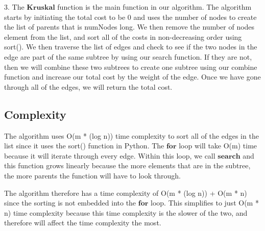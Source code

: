 3. The $\textbf{Kruskal}$ function is the main function in our algorithm. The algorithm starts by initiating the total cost to be 0 and uses the number of nodes to create the list of parents that is numNodes long. We then remove the number of nodes element from the list, and sort all of the costs in non-decreasing order using sort(). We then traverse the list of edges and check to see if the two nodes in the edge are part of the same subtree by using our search function. If they are not, then we will combine these two subtrees to create one subtree using our combine function and increase our total cost by the weight of the edge. Once we have gone through all of the edges, we will return the total cost.  

\subsection{Complexity}
The algorithm uses O(m * (log n)) time complexity to sort all of the edges in the list since it uses the sort() function in Python. The $\textbf{for}$ loop will take O(m) time because it will iterate through every edge. Within this loop, we call $\textbf{search}$ and this function grows linearly because the more elements that are in the subtree, the more parents the function will have to look through. 

The algorithm therefore has a time complexity of O(m * (log n)) + O(m * n) since the sorting is not embedded into the $\textbf{for}$ loop. This simplifies to just O(m * n) time complexity because this time complexity is the slower of the two, and therefore will affect the time complexity the most.

\pagebreak